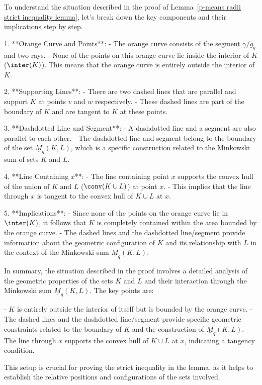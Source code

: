 To understand the situation described in the proof of Lemma~\ref{p-means radii strict inequality lemma}, let's break down the key components and their implications step by step.

1. **Orange Curve and Points**:
   - The orange curve consists of the segment \(\gamma/g_q\) and two rays.
   - None of the points on this orange curve lie inside the interior of \(K\) (\(\inter(K)\)). This means that the orange curve is entirely outside the interior of \(K\).

2. **Supporting Lines**:
   - There are two dashed lines that are parallel and support \(K\) at points \(v\) and \(w\) respectively.
   - These dashed lines are part of the boundary of \(K\) and are tangent to \(K\) at these points.

3. **Dashdotted Line and Segment**:
   - A dashdotted line and a segment are also parallel to each other.
   - The dashdotted line and segment belong to the boundary of the set \(\underline{M}_q(K, L)\), which is a specific construction related to the Minkowski sum of sets \(K\) and \(L\).

4. **Line Containing \(x\)**:
   - The line containing point \(x\) supports the convex hull of the union of \(K\) and \(L\) (\(\conv(K \cup L)\)) at point \(x\).
   - This implies that the line through \(x\) is tangent to the convex hull of \(K \cup L\) at \(x\).

5. **Implications**:
   - Since none of the points on the orange curve lie in \(\inter(K)\), it follows that \(K\) is completely contained within the area bounded by the orange curve.
   - The dashed lines and the dashdotted line/segment provide information about the geometric configuration of \(K\) and its relationship with \(L\) in the context of the Minkowski sum \(\underline{M}_q(K, L)\).

In summary, the situation described in the proof involves a detailed analysis of the geometric properties of the sets \(K\) and \(L\) and their interaction through the Minkowski sum \(\underline{M}_q(K, L)\). The key points are:

- \(K\) is entirely outside the interior of itself but is bounded by the orange curve.
- The dashed lines and the dashdotted line/segment provide specific geometric constraints related to the boundary of \(K\) and the construction of \(\underline{M}_q(K, L)\).
- The line through \(x\) supports the convex hull of \(K \cup L\) at \(x\), indicating a tangency condition.

This setup is crucial for proving the strict inequality in the lemma, as it helps to establish the relative positions and configurations of the sets involved.